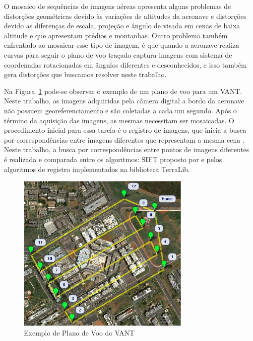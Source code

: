 \documentclass[9pt, a4paper, nofonttune, journal]{IEEEtran}
\begin{document}
O mosaico de sequências de imagens aéreas apresenta alguns problemas de distorções geométricas devido às variações de altitudes da aeronave e 
distorções devido as diferenças de escala, projeção e ângulo de visada em cenas de baixa altitude e que apresentam prédios e montanhas. 
Outro problema também enfrentado ao mosaicar esse tipo de imagem, 
é que quando a aeronave realiza curvas para seguir o plano de voo traçado captura imagens com sistema de coordenadas rotacionadas em ângulos diferentes e desconhecidos, 
e isso também gera distorções que buscamos resolver neste trabalho.

Na Figura~\ref{fig:plano_voo} pode-se observar o exemplo de um plano de voo para um VANT. 
Neste trabalho, as imagens adquiridas pela câmera digital a bordo da aeronave não possuem georeferenciamento e são coletadas a cada um segundo. 
Após o término da aquisição das imagens, as mesmas necessitam ser mosaicadas. 
O procedimento inicial para essa tarefa é o registro de imagens, que inicia a busca por correspondências entre imagens diferentes que representam a mesma cena \cite{Goltz:08}. 
Neste trabalho, a busca por correspondências entre pontos de imagens diferentes é realizada e comparada entre os algoritmos: SIFT proposto por \cite{Lowe} 
e pelos algoritmos de registro implementados na biblioteca TerraLib.

\begin{figure}[h!t]
  \centering
  \includegraphics[width=3.3in]{figuras/plano_voo}
  \caption{Exemplo de Plano de Voo do VANT}
  \label{fig:plano_voo}
\end{figure}
\end{document}
